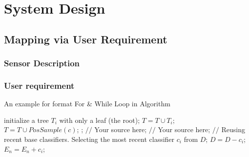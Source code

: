 \chapter{System Design}
\label{c:sys_design}

\section{Mapping via User Requirement}

\subsection{Sensor Description}

\subsection{User requirement}

\begin{algorithm}[h]
  \caption{An example for format For \& While Loop in Algorithm}
  \begin{algorithmic}[1]
      \State initialize a tree $T_{i}$ with only a leaf (the root);
      \State $T=T\cup T_{i};$
    \EndFor
      \label{code:TrainBase:getc}
      \State $T=T\cup PosSample(c)$;
      \label{code:TrainBase:pos}
    \EndFor;
      \State $//$ Your source here;
    \EndFor
      \State $//$ Your source here;
    \EndFor
    \State $//$ Reusing recent base classifiers.
    \label{code:recentStart}
      \State Selecting the most recent classifier $c_i$ from $D$;
      \State $D=D-c_i$;
      \State $E_n=E_n+c_i$;
    \EndWhile
    \label{code:recentEnd}
  \end{algorithmic}
\end{algorithm}